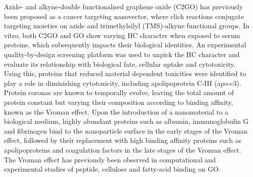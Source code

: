 Azide- and alkyne-double functionalised graphene oxide (C2GO) has previously been proposed as a cancer targeting nanovector,\cite{mei2015synthesis} where click reactions conjugate targeting moieties on azide and trimethylsilyl (TMS)-alkyne functional groups.\cite{rubio2015solvent} In vitro, both C2GO and GO show varying HC character when exposed to serum proteins, which subsequently impacts their biological identities.\cite{mei2018protein} An experimental quality-by-design screening platform was used to unpick the HC character and evaluate its relationship with biological fate, cellular uptake and cytotoxicity. Using this, proteins that reduced material dependent toxicities were identified to play a role in diminishing cytotoxicity, including apolipoprotein C-III (apo-c3).\cite{mei2018protein} \\

Protein coronas are known to temporally evolve, leaving the total amount of protein constant but varying their composition according to binding affinity, known as the Vroman effect.\cite{vroman1980interaction} Upon the introduction of a nanomaterial to a biological medium, highly abundant proteins such as albumin, immunoglobulin G and fibrinogen bind to the nanoparticle surface in the early stages of the Vroman effect, followed by their replacement with high binding affinity proteins such as apolipoproteins and coagulation factors in the late stages of the Vroman effect.\cite{foroozandeh2015merging, ehrenberg2009influence, harnisch2000adsorption, goppert2005polysorbate, vroman1980interaction} The Vroman effect has previously been observed in computational and experimental studies of peptide, cellulose and fatty-acid binding on GO.\cite{radic2013competitive} \\

